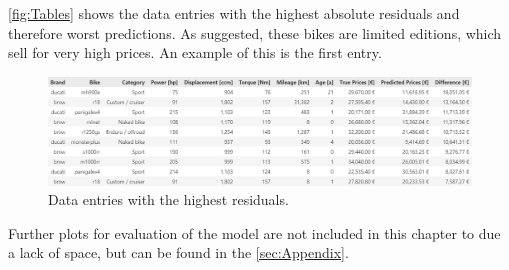 \autoref{fig:Tables} shows the data entries with the highest absolute residuals and therefore worst predictions. As suggested, these bikes are limited editions, which sell
for very high prices. An example of this is the first entry.

\begin{figure}
\centering
    \includegraphics[width=\textwidth]{"content/pics/Table_Worst.png"}
\caption{Data entries with the highest residuals.}
\label{fig:Tables}
\end{figure}
Further plots for evaluation of the model are not included in this chapter to due a lack of space, but can be found in the \autoref{sec:Appendix}.